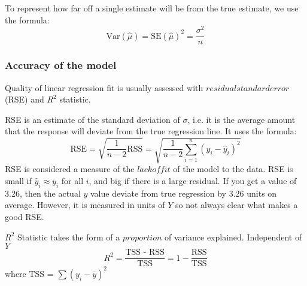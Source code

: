 \documentclass[12pt]{article}
\begin{document}
To represent how far off a single estimate will be from the true estimate, we use the formula:
\[\text{Var}(\hat{\mu}) = \text{SE}(\hat{\mu})^2 = \frac{\sigma^2}{n}\]

\subsubsection{Accuracy of the model}
Quality of linear regression fit is usually assessed with $residual standard error$ (RSE) and $R^2$ statistic.

RSE is an estimate of the standard deviation of $\sigma$, i.e. it is the average amount that the response will deviate from the true regression line. It uses the formula:
\[\text{RSE} = \sqrt{\frac{1}{n-2}\text{RSS}} = \sqrt{\frac{1}{n-2}\sum^n_{i=1}{(y_i - \hat{y}_i)^2}}\]
RSE is considered a measure of the $lack of fit$ of the model to the data. RSE is small if $\hat{y}_i \approx y_i$ for all $i$, and big if there is a large residual. If you get a value of 3.26, then the actual $y$ value deviate from true regression by 3.26 units on average. However, it is measured in units of $Y$ so not always clear what makes a good RSE.

$R^2$ Statistic takes the form of a $proportion$ of variance explained. Independent of $Y$
\[R^2 = \frac{\text{TSS - RSS}}{\text{TSS}} = 1 - \frac{\text{RSS}}{\text{TSS}} \]
where TSS = $\sum{(y_i - \bar{y})^2}$
\end{document}
